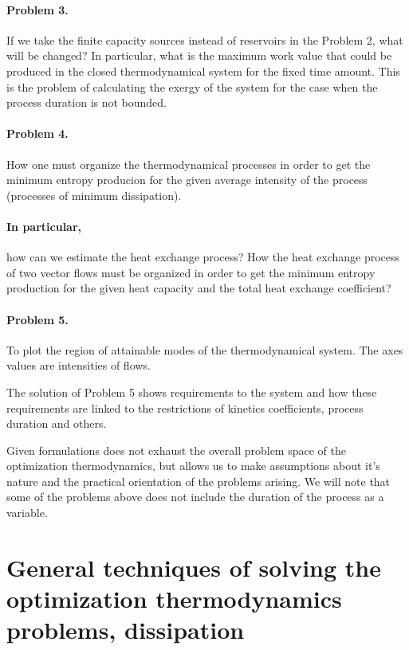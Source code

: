 \documentclass[epjST]{svjour}
\begin{document}
\paragraph{Problem 3.} If we take the finite capacity sources instead of reservoirs in the Problem 2, what will be changed? In particular, what is the maximum work value that could be produced in the closed thermodynamical system for the fixed time amount. This is the problem of calculating the exergy of the system for the case when the process duration is not bounded.

\paragraph{Problem 4.} How one must organize the thermodynamical processes in order to get the minimum entropy producion for the given average intensity of the process (processes of minimum dissipation).

\paragraph{In particular,} how can we estimate the heat exchange process? How the heat exchange process of two vector flows must be organized in order to get the minimum entropy production for the given heat capacity and the total heat exchange coefficient?

\paragraph{Problem 5.} To plot the region of attainable modes of the thermodynamical system. The axes values are intensities of flows.

The solution of Problem 5 shows requirements to the system and how these requirements are linked to the restrictions of kinetics coefficients, process duration and others.

Given formulations does not exhaust the overall problem space of the optimization thermodynamics, but allows us to make assumptions about it's nature and the practical orientation of the problems arising. We will note that some of the problems above does not include the duration of the process as a variable.

\section{General techniques of solving the optimization thermodynamics problems, dissipation}
\end{document}
